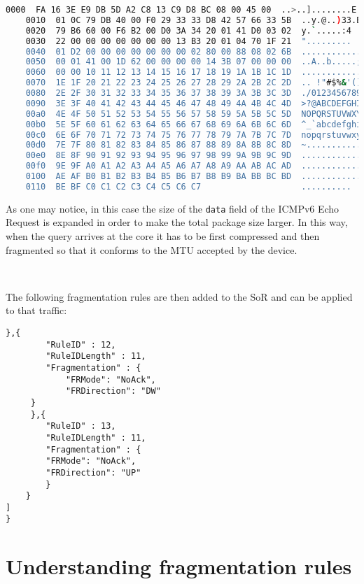 \begin{lstlisting}[language=bash, basicstyle=\ttfamily\tiny, showstringspaces=false]
    0000  FA 16 3E E9 DB 5D A2 C8 13 C9 D8 BC 08 00 45 00  ..>..]........E.
    0010  01 0C 79 DB 40 00 F0 29 33 33 D8 42 57 66 33 5B  ..y.@..)33.BWf3[
    0020  79 B6 60 00 F6 B2 00 D0 3A 34 20 01 41 D0 03 02  y.`.....:4 .A...
    0030  22 00 00 00 00 00 00 00 13 B3 20 01 04 70 1F 21  "......... ..p.!
    0040  01 D2 00 00 00 00 00 00 00 02 80 00 88 08 02 6B  ...............k
    0050  00 01 41 00 1D 62 00 00 00 00 14 3B 07 00 00 00  ..A..b.....;....
    0060  00 00 10 11 12 13 14 15 16 17 18 19 1A 1B 1C 1D  ................
    0070  1E 1F 20 21 22 23 24 25 26 27 28 29 2A 2B 2C 2D  .. !"#$%&'()*+,-
    0080  2E 2F 30 31 32 33 34 35 36 37 38 39 3A 3B 3C 3D  ./0123456789:;<=
    0090  3E 3F 40 41 42 43 44 45 46 47 48 49 4A 4B 4C 4D  >?@ABCDEFGHIJKLM
    00a0  4E 4F 50 51 52 53 54 55 56 57 58 59 5A 5B 5C 5D  NOPQRSTUVWXYZ[\]
    00b0  5E 5F 60 61 62 63 64 65 66 67 68 69 6A 6B 6C 6D  ^_`abcdefghijklm
    00c0  6E 6F 70 71 72 73 74 75 76 77 78 79 7A 7B 7C 7D  nopqrstuvwxyz{|}
    00d0  7E 7F 80 81 82 83 84 85 86 87 88 89 8A 8B 8C 8D  ~...............
    00e0  8E 8F 90 91 92 93 94 95 96 97 98 99 9A 9B 9C 9D  ................
    00f0  9E 9F A0 A1 A2 A3 A4 A5 A6 A7 A8 A9 AA AB AC AD  ................
    0100  AE AF B0 B1 B2 B3 B4 B5 B6 B7 B8 B9 BA BB BC BD  ................
    0110  BE BF C0 C1 C2 C3 C4 C5 C6 C7                    ..........
\end{lstlisting}

As one may notice, in this case the size of the \texttt{data} field of the ICMPv6 Echo Request is expanded in order to make the total package size larger. 
In this way, when the query arrives at the core it has to be first compressed and then fragmented so that it conforms to the MTU accepted by the device.

~

The following fragmentation rules are then added to the SoR and can be applied to that traffic:

\begin{lstlisting}[caption={Fragmentation Rules in rule icmp2.json}, backgroundcolor=\color{yellow}, basicstyle=\ttfamily\small, label=rule-icmp2]
	 },{
		"RuleID" : 12,
		"RuleIDLength" : 11,
		"Fragmentation" : {
			"FRMode": "NoAck",
			"FRDirection": "DW"
	 }
	 },{	
		"RuleID" : 13,
		"RuleIDLength" : 11,
		"Fragmentation" : {
		"FRMode": "NoAck",
		"FRDirection": "UP"
		} 
    }
]
}
\end{lstlisting}

\section{Understanding fragmentation rules}

